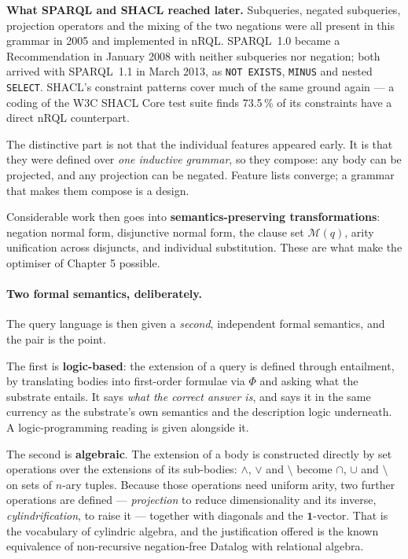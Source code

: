 \documentclass[11pt,a4paper,DIV=12,parskip=half]{scrartcl}
\newenvironment{note}
  {\begin{list}{}{\setlength{\leftmargin}{1.5em}\setlength{\rightmargin}{1.5em}%
                  \setlength{\listparindent}{0pt}}\item[]\small}
  {\end{list}}
\begin{document}
\begin{note}
\textbf{What SPARQL and SHACL reached later.} Subqueries, negated subqueries,
projection operators and the mixing of the two negations were all present in this
grammar in 2005 and implemented in nRQL. SPARQL~1.0 became a Recommendation in
January 2008 with neither subqueries nor negation; both arrived with
SPARQL~1.1 in March 2013, as \texttt{NOT EXISTS}, \texttt{MINUS} and nested
\texttt{SELECT}. SHACL's constraint patterns cover much of the same ground again
--- a coding of the W3C SHACL Core test suite finds 73.5\,\% of its constraints
have a direct nRQL counterpart.

The distinctive part is not that the individual features appeared early. It is
that they were defined over \emph{one inductive grammar}, so they compose: any
body can be projected, and any projection can be negated. Feature lists converge;
a grammar that makes them compose is a design.
\end{note}

Considerable work then goes into \textbf{semantics-preserving transformations}:
negation normal form, disjunctive normal form, the clause set $\mathcal{M}(q)$,
arity unification across disjuncts, and individual substitution. These are what
make the optimiser of Chapter 5 possible.

\paragraph{Two formal semantics, deliberately.}
The query language is then given a \emph{second}, independent formal semantics,
and the pair is the point.

The first is \textbf{logic-based}: the extension of a query is defined through
entailment, by translating bodies into first-order formulae via $\Phi$ and asking
what the substrate entails. It says \emph{what the correct answer is}, and says
it in the same currency as the substrate's own semantics and the description
logic underneath. A logic-programming reading is given alongside it.

The second is \textbf{algebraic}. The extension of a body is constructed
directly by set operations over the extensions of its sub-bodies: $\wedge$,
$\vee$ and $\setminus$ become $\cap$, $\cup$ and $\setminus$ on sets of $n$-ary
tuples. Because those operations need uniform arity, two further operations are
defined --- \emph{projection} to reduce dimensionality and its inverse,
\emph{cylindrification}, to raise it --- together with diagonals and the
$\mathbf{1}$-vector. That is the vocabulary of cylindric algebra, and the
justification offered is the known equivalence of non-recursive negation-free
Datalog with relational algebra.
\end{document}
